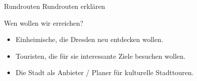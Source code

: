 \documentclass[13pt, usenames, dvipsnames]{beamer}
\begin{document}
\begin{frame}{Rundrouten}
    Rundrouten erklären
\end{frame}

\begin{frame}{Wen wollen wir erreichen?}
    \begin{itemize}
        \item Einheimische, die Dresden neu entdecken wollen.
        \item Touristen, die für sie interessante Ziele besuchen wollen.
        \item Die Stadt als Anbieter / Planer für kulturelle Stadttouren.
    \end{itemize}
\end{frame}
\end{document}

